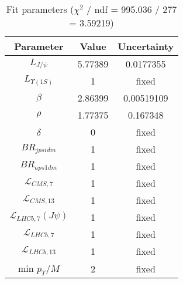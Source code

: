 \begin{table}[h!]
\centering
\begin{tabular}{c|c|c}
Parameter & Value & Uncertainty \\
\hline
$L_{J/\psi}$ & 5.77389 & 0.0177355 \\
$L_{\Upsilon(1S)}$ & 1 & fixed \\
$\beta$ & 2.86399 & 0.00519109 \\
$\rho$ & 1.77375 & 0.167348 \\
$\delta$ & 0 & fixed \\
$BR_{jpsidm}$ & 1 & fixed \\
$BR_{ups1dm}$ & 1 & fixed \\
$\mathcal L_{CMS,7}$ & 1 & fixed \\
$\mathcal L_{CMS,13}$ & 1 & fixed \\
$\mathcal L_{LHCb,7}(J\psi)$ & 1 & fixed \\
$\mathcal L_{LHCb,7}$ & 1 & fixed \\
$\mathcal L_{LHCb,13}$ & 1 & fixed \\
min $p_T/M$ & 2 & fixed \\
\end{tabular}
\caption{Fit parameters ($\chi^2$ / ndf = 995.036 / 277 = 3.59219)}
\end{table}
